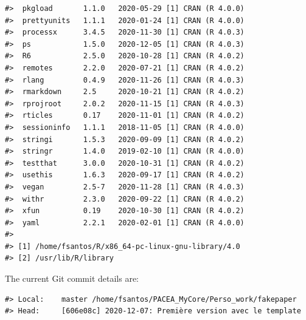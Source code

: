 \documentclass[]{elsarticle} %
\begin{document}
\begin{verbatim}
#>  pkgload       1.1.0   2020-05-29 [1] CRAN (R 4.0.0)
#>  prettyunits   1.1.1   2020-01-24 [1] CRAN (R 4.0.0)
#>  processx      3.4.5   2020-11-30 [1] CRAN (R 4.0.3)
#>  ps            1.5.0   2020-12-05 [1] CRAN (R 4.0.3)
#>  R6            2.5.0   2020-10-28 [1] CRAN (R 4.0.2)
#>  remotes       2.2.0   2020-07-21 [1] CRAN (R 4.0.2)
#>  rlang         0.4.9   2020-11-26 [1] CRAN (R 4.0.3)
#>  rmarkdown     2.5     2020-10-21 [1] CRAN (R 4.0.2)
#>  rprojroot     2.0.2   2020-11-15 [1] CRAN (R 4.0.3)
#>  rticles       0.17    2020-11-01 [1] CRAN (R 4.0.2)
#>  sessioninfo   1.1.1   2018-11-05 [1] CRAN (R 4.0.0)
#>  stringi       1.5.3   2020-09-09 [1] CRAN (R 4.0.2)
#>  stringr       1.4.0   2019-02-10 [1] CRAN (R 4.0.0)
#>  testthat      3.0.0   2020-10-31 [1] CRAN (R 4.0.2)
#>  usethis       1.6.3   2020-09-17 [1] CRAN (R 4.0.2)
#>  vegan         2.5-7   2020-11-28 [1] CRAN (R 4.0.3)
#>  withr         2.3.0   2020-09-22 [1] CRAN (R 4.0.2)
#>  xfun          0.19    2020-10-30 [1] CRAN (R 4.0.2)
#>  yaml          2.2.1   2020-02-01 [1] CRAN (R 4.0.0)
#> 
#> [1] /home/fsantos/R/x86_64-pc-linux-gnu-library/4.0
#> [2] /usr/lib/R/library
\end{verbatim}

The current Git commit details are:

\begin{verbatim}
#> Local:    master /home/fsantos/PACEA_MyCore/Perso_work/fakepaper
#> Head:     [606e08c] 2020-12-07: Première version avec le template
\end{verbatim}
\end{document}
